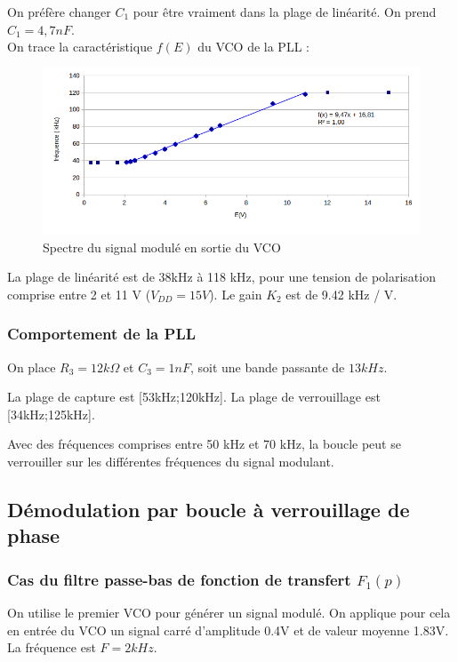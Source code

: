 \documentclass[../../Cours_M1.tex]{subfiles}
\begin{document}
On préfère changer $C_1$ pour être vraiment dans la plage de linéarité. On prend $C_1=4,7nF$.\\

On trace la caractéristique $f(E)$ du VCO de la PLL :

\begin{figure}[h!]
\centering
\includegraphics[width=\textwidth]{f(E)2.png}
\caption{Spectre du signal modulé en sortie du VCO}
\end{figure}

La plage de linéarité est de 38kHz à 118 kHz, pour une tension de polarisation comprise entre 2 et 11 V ($V_{DD} = 15V$). Le gain $K_2$ est de 9.42 kHz / V.

\subsubsection{Comportement de la PLL}
On place $R_3 = 12 k\Omega$ et $C_3 = 1nF$, soit une bande passante de $13 kHz$. 

La plage de capture est [53kHz;120kHz]. La plage de verrouillage est [34kHz;125kHz].

Avec des fréquences comprises entre 50 kHz et 70 kHz, la boucle peut se verrouiller sur les différentes fréquences du signal modulant.

\newpage
\subsection{Démodulation par boucle à verrouillage de phase}

\subsubsection{Cas du filtre passe-bas de fonction de transfert $F_1(p)$}

On utilise le premier VCO pour générer un signal modulé. On applique pour cela en entrée du VCO un signal carré d'amplitude 0.4V et de valeur moyenne 1.83V. La fréquence est $F=2 kHz$.\\
\end{document}
